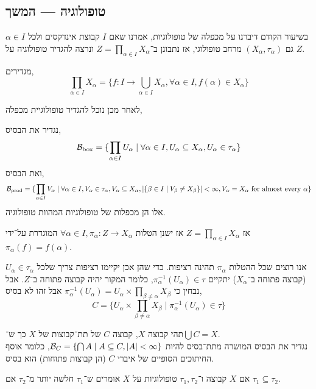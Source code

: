 \subsection{טופולוגיה --- המשך}
בשיעור הקודם דיברנו על מכפלה של טופולוגיות, אמרנו שאם $I$ קבוצת אינדקסים ולכל $\alpha \in I$ גם $(X_\alpha, \tau_\alpha)$ מרחב טופולוגי, אז נתבונן ב־$Z = \prod_{\alpha \in I} X_\alpha$ ונרצה להגדיר טופולוגיה על $Z$.
\begin{remark}
	מגדירים,
	\[
		\prod_{\alpha \in I} X_\alpha = \{ f : I \to \bigcup_{\alpha \in I} X_\alpha, \forall \alpha \in I, f(\alpha) \in X_\alpha \}
	\]
\end{remark}
לאחר מכן נוכל להגדיר טופולוגיית מכפלה,
\begin{definition}
	נגדיר את הבסיס,
	\[
		\mathcal{B}_{\text{box}} = \{ \prod_{\alpha \in I} U_\alpha \mid \forall \alpha \in I, U_\alpha \subseteq X_\alpha, U_\alpha \in \tau_\alpha \}
	\]
	ואת הבסיס,
	\[
		\mathcal{B}_{\text{prod}}
		= \{ \prod_{\alpha \in I} V_\alpha \mid \forall \alpha \in I, V_\alpha \in \tau_\alpha,
			V_\alpha \subseteq X_\alpha, |\{ \beta \in I \mid V_\beta \ne X_\beta \}| < \infty, V_\alpha = X_\alpha \text{ for almost every } \alpha \}
	\]
	אלו הן מכפלות של טופולוגיות המהוות טופולוגיה.
\end{definition}
\begin{definition}
	אז $Z = \prod_{\alpha \in I} X_\alpha$ אז ישנן הטלות $\forall \alpha \in I, \pi_\alpha : Z \to X_\alpha$ המוגדרת על־ידי $\pi_\alpha(f) = f(\alpha)$.
\end{definition}
אנו רוצים שכל ההטלות $\pi_\alpha$ תהינה רציפות.
כדי שהן אכן יקיימו רציפות צריך שלכל $U_\alpha \in \tau_\alpha$ (קבוצה פתוחה ב־$X_\alpha$) יתקיים $\pi_\alpha^{-1}(U_\alpha) \in \tau$, כלומר המקור יהיה קבוצה פתוחה ב־$Z$.
אבל נבחין כי $\pi_\alpha^{-1}(U_\alpha) = U_\alpha \times \prod_{\beta \ne \alpha} X_\beta$ אבל זהו לא בסיס,
\[
	C = \{ U_\alpha \times \prod_{\beta \ne \alpha} X_\beta \mid \pi_\alpha^{-1}(U_\alpha) \in \tau \}
\]
\begin{definition}
	תהי קבוצה $X$, קבוצה $C$ של תת־קבוצות של $X$ כך ש־$\bigcup C = X$. \\
	נגדיר את הבסיס המושרה מתת־בסיס להיות $\mathcal{B}_C = \{ \bigcap A \mid A \subseteq C, |A| < \infty \}$,
	כלומר אוסף החיתוכים הסופיים של איברי $C$ (הן קבוצות פתוחות) הוא בסיס.
\end{definition}
\begin{definition}
	אם $X$ קבוצה ו־$\tau_1, \tau_2$ טופולוגיות על $X$ אומרים ש־$\tau_1$ חלשה יותר מ־$\tau_2$ אם $\tau_1 \subseteq \tau_2$.
\end{definition}
